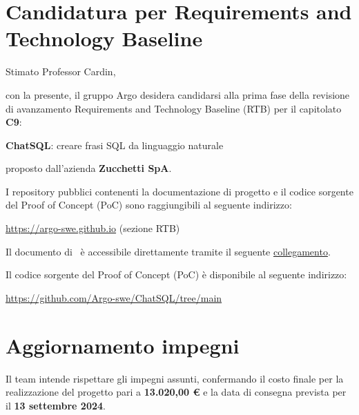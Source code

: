 





\makeFrontPage

\section*{Candidatura per Requirements and Technology Baseline}
\par Stimato Professor Cardin, \newline

con la presente, il gruppo Argo desidera candidarsi alla prima fase della revisione di avanzamento Requirements and Technology Baseline (RTB) per il capitolato \textbf{C9}: \newline

\quad \textbf{ChatSQL}: creare frasi SQL da linguaggio naturale \newline

proposto dall'azienda \textbf{Zucchetti SpA}. \newline

\par I repository pubblici contenenti la documentazione di progetto e il codice sorgente del Proof of Concept (PoC) sono raggiungibili al seguente indirizzo: \newline

\quad \href{https://argo-swe.github.io}{https://argo-swe.github.io} (sezione RTB) \newline

\par Il documento di \AdR\ è accessibile direttamente tramite il seguente \href{https://argo-swe.github.io}{collegamento}. \newline

\par Il codice sorgente del Proof of Concept (PoC) è disponibile al seguente indirizzo: \newline

\quad \href{https://github.com/Argo-swe/ChatSQL/tree/main}{https://github.com/Argo-swe/ChatSQL/tree/main} \newline

\section*{Aggiornamento impegni}
\par Il team intende rispettare gli impegni assunti, confermando il costo finale per la realizzazione del progetto pari a \textbf{13.020,00 €} e la data di consegna prevista per il \textbf{13 settembre 2024}. \newline

